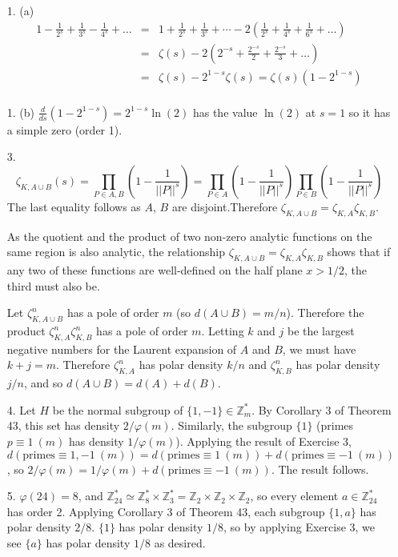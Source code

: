 \documentclass{article}
\newcommand{\z}[0]{\zeta}
\newcommand{\Z}[0]{\mathbb{Z}}
\newcommand{\Zmult}[1]{\mathbb{Z}_{#1}^{*}}
\newcommand{\modequiv}[3]{#1 \equiv #2\ (#3)}
\begin{document}
\begin{enumerate}
    \item [1. (a)]
    \begin{eqnarray*}
        1 - \frac{1}{2^s} + \frac{1}{3^s} - \frac{1}{4^s} + \ldots &=& 1 + \frac{1}{2^s} + \frac{1}{3^s} + \cdots - 2 \left( \frac{1}{2^s} + \frac{1}{4^s} + \frac{1}{6^s} + \ldots \right) \\
        &=& \zeta(s) - 2\left(2^{-s} + \frac{2^{-s}}{2} + \frac{2^{-s}}{3} + \ldots \right) \\
        &=& \zeta(s) - 2^{1-s}\zeta(s) = \zeta(s) (1 - 2^{1-s}) \\
    \end{eqnarray*}
    \item [1. (b)]
        $\frac{d}{ds} (1 - 2^{1-s}) = 2^{1-s} \ln (2)$ has the value $\ln(2)$ at $s = 1$ so it has a simple zero (order 1).
    \item [3.]
    \[ \z_{K, A \cup B}(s) = \prod_{P \in A, B} \left(1 - \frac{1}{||P||^{s}}\right) = \prod_{P \in A} \left(1 - \frac{1}{||P||^{s}}\right) \prod_{P \in B} \left(1 - \frac{1}{||P||^{s}}\right) \] The last equality follows as $A$, $B$ are disjoint.Therefore $\z_{K, A \cup B} = \z_{K, A} \z_{K, B}$.

    As the quotient and the product of two non-zero analytic functions on the same region is also analytic, the relationship $\z_{K, A \cup B} = \z_{K, A} \z_{K, B}$ shows that if any two of these functions are well-defined on the half plane $x > 1/2$, the third must also be.

    Let $\z_{K, A \cup B}^{n}$ has a pole of order $m$ (so $d(A \cup B) = m /n$).  Therefore the product $\z_{K, A}^{n} \z_{K, B}^{n}$ has a pole of order $m$.  Letting $k$ and $j$ be the largest negative numbers for the Laurent expansion of $A$ and $B$, we must have $k + j = m$.  Therefore $\z_{K, A}^{n}$ has polar density $k / n$ and $\z_{K, B}^{n}$ has polar density $j / n$, and so $d(A \cup B) = d(A) + d(B)$.

    \item [4.] Let $H$ be the normal subgroup of $\{1, -1\} \in \Z^{*}_m$. By Corollary 3 of Theorem 43, this set has density $2 / \varphi(m)$.  Similarly, the subgroup $\{1\}$ (primes $\modequiv{p}{1}{m}$ has density $1 / \varphi(m)$).  Applying the result of Exercise 3, $d(\modequiv{\text{primes}}{1, -1}{m}) = d(\modequiv{\text{primes}}{1}{m}) + d(\modequiv{\text{primes}}{-1}{m})$, so $2 / \varphi(m) = 1 / \varphi(m) + d(\modequiv{\text{primes}}{-1}{m})$.  The result follows.

    \item [5.] $\varphi(24) = 8$, and $\Zmult{24} \simeq \Zmult{8} \times \Zmult{3} = \Z_{2} \times \Z_{2} \times \Z_{2}$, so every element $a \in \Zmult{24}$ has order 2.  Applying Corollary 3 of Theorem 43, each subgroup $\{1, a\}$ has polar density $2 / 8$.  $\{1\}$ has polar density $1 / 8$, so by applying Exercise 3, we see $\{a\}$ has polar density $1 / 8$ as desired.

\end{enumerate}
\end{document}
